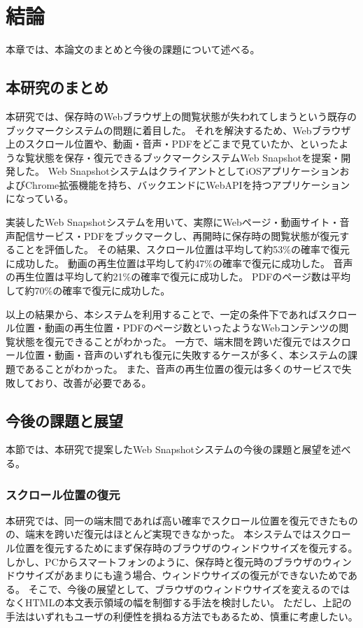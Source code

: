 \chapter{結論}
\label{chap:conclusion}
本章では、本論文のまとめと今後の課題について述べる。

\section{本研究のまとめ}
\label{section:conclusion}
本研究では、保存時のWebブラウザ上の閲覧状態が失われてしまうという既存のブックマークシステムの問題に着目した。
それを解決するため、Webブラウザ上のスクロール位置や、動画・音声・PDFをどこまで見ていたか、といったような覧状態を保存・復元できるブックマークシステムWeb Snapshotを提案・開発した。
Web SnapshotシステムはクライアントとしてiOSアプリケーションおよびChrome拡張機能を持ち、バックエンドにWebAPIを持つアプリケーションになっている。

実装したWeb Snapshotシステムを用いて、実際にWebページ・動画サイト・音声配信サービス・PDFをブックマークし、再開時に保存時の閲覧状態が復元することを評価した。
その結果、スクロール位置は平均して約53\%の確率で復元に成功した。
動画の再生位置は平均して約47\%の確率で復元に成功した。
音声の再生位置は平均して約21\%の確率で復元に成功した。
PDFのページ数は平均して約70\%の確率で復元に成功した。

以上の結果から、本システムを利用することで、一定の条件下であればスクロール位置・動画の再生位置・PDFのページ数といったようなWebコンテンツの閲覧状態を復元できることがわかった。
一方で、端末間を跨いだ復元ではスクロール位置・動画・音声のいずれも復元に失敗するケースが多く、本システムの課題であることがわかった。
また、音声の再生位置の復元は多くのサービスで失敗しており、改善が必要である。

\section{今後の課題と展望}
本節では、本研究で提案したWeb Snapshotシステムの今後の課題と展望を述べる。

\subsection{スクロール位置の復元}
本研究では、同一の端末間であれば高い確率でスクロール位置を復元できたものの、端末を跨いだ復元はほとんど実現できなかった。
本システムではスクロール位置を復元するためにまず保存時のブラウザのウィンドウサイズを復元する。
しかし、PCからスマートフォンのように、保存時と復元時のブラウザのウィンドウサイズがあまりにも違う場合、ウィンドウサイズの復元ができないためである。
そこで、今後の展望として、ブラウザのウィンドウサイズを変えるのではなくHTMLの本文表示領域の幅を制御する手法を検討したい。
ただし、上記の手法はいずれもユーザの利便性を損ねる方法でもあるため、慎重に考慮したい。


